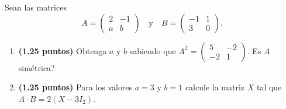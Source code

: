 
Sean las matrices
\[
A=\begin{pmatrix}2&-1\\a&b\end{pmatrix}\quad\text{y}\quad
B=\begin{pmatrix}-1&1\\3&0\end{pmatrix}.
\]
\begin{enumerate}[label=\alph*)]
\item \textbf{(1.25 puntos)} Obtenga $a$ y $b$ sabiendo que $A^2=\begin{pmatrix}5&-2\\-2&1\end{pmatrix}$. \textquestiondown{}Es $A$ simétrica?
\item \textbf{(1.25 puntos)} Para los valores $a=3$ y $b=1$ calcule la matriz $X$ tal que $A\cdot B=2(X-3I_2)$.
\end{enumerate}
